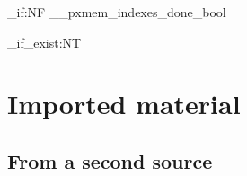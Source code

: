 \documentclass[MEM,CAT]{P3CTeX}
\begin{document}
\ExplSyntaxOn
\bool_if:NF \g__pxmem_indexes_done_bool
  {\PackageError{pxMEM.test}{MEM indexes were not printed automatically}{}}
\cs_if_exist:NT \pxTFGworkcard
  {\PackageError{pxMEM.test}{Generic MEM unexpectedly loaded pxTFG}{}}
\ExplSyntaxOff
{}
\chapter{Imported material}
\section{From a second source}
\end{document}
